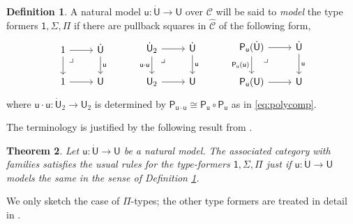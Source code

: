 \documentclass[12pt,reqno]{amsart}
\newcommand{\CC}{\ensuremath{\mathcal{C}}}
\newcommand{\alg}[1]{\ensuremath{\mathsf{#1}}}
\renewcommand{\to}{\ensuremath{\rightarrow}}
\renewcommand{\t}{\ensuremath{\mathsf{u}}}
\newcommand{\T}{\ensuremath{\mathsf{U}}}
\newcommand{\TT}{\ensuremath{\dot{\mathsf{U}}}}
\newcommand{\tT}{\ensuremath{{\t}:\TT\to\T}}
\newcommand{\pbcorner}{\arrow[dr,phantom,"\lrcorner" very near start, shift right=.5ex]} %
\newtheorem{theorem}{Theorem}
\theoremstyle{remark}
\theoremstyle{definition}
\newtheorem{definition}[theorem]{Definition}
\begin{document}
\begin{definition}\label{def:modelthetypeformers}
A natural model $\tT$ over $\CC$ will be said to \emph{model} the type formers $ \mathsf{1}, \Sigma, \Pi$ if there are pullback squares in $\widehat{\CC}$ of the following form,
%
\begin{equation}\label{diag:naturalmodelPiSigma1}
\begin{tikzcd}
	1 \ar[r] \ar[d] \pbcorner &  \TT \ar[d, "\t"]\\  
	1 \ar[r] & \T
 \end{tikzcd} \qquad \quad 
 \begin{tikzcd}
	\TT_2  \ar[r] \ar[d,swap,"\t\cdot\t"] \pbcorner &  \TT \ar[d, "\t"]\\  
	\T_2 \ar[r] & \T
	 \end{tikzcd} \qquad \quad 
	 \begin{tikzcd}
	 \alg{P}_\t(\TT) \ar[r] \ar[d,swap,"\alg{P}_\t(\t)"] \pbcorner &  \TT \ar[d, "\t"]\\  
	\alg{P}_\t(\T) \ar[r] & \T
 \end{tikzcd} 
 \end{equation}
%
where $\t\cdot\t : \dot{\T}_2 \to \T_2$ is determined by $\alg{P}_{\t\cdot\t} \cong  \alg{P}_{\t} \circ \alg{P}_{\t}$ as in \eqref{eq:polycomp}.
\end{definition}
%
The terminology is justified by the following result from \cite[Theorem 16]{awodey:NM}.
%
\begin{theorem}\label{thm:nmcwf}
Let $\tT$ be a natural model. The associated category with families satisfies the usual rules for the type-formers $\mathsf{1}, \Sigma, \Pi$ just if $\tT$ models the same in the sense of Definition \ref{def:modelthetypeformers}.
\end{theorem}

We only sketch the case of $\Pi$-types; the other type formers are treated in detail in \cite{awodey:NM, Newstead:thesis, NA:2018}.
\end{document}
